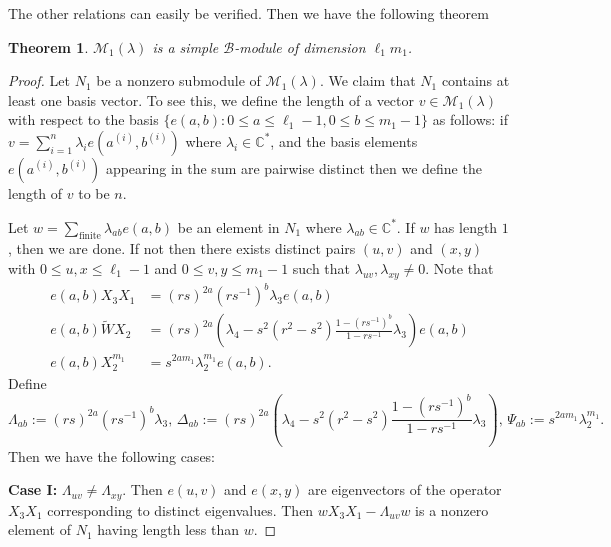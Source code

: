 \documentclass[12 pt,reqno]{amsart}
\numberwithin{equation}{section}
\newtheorem{thm}{Theorem}[section]
\theoremstyle{definition}
\theoremstyle{definition}
\theoremstyle{remark}
\theoremstyle{remark}
\begin{document}
The other relations can easily be verified. Then we have the following theorem
\begin{thm}\label{dim1}
    $\mathcal{M}_1(\lambda)$ is a simple $\mathcal{B}$-module of dimension $\ell_1 m_1$.
\end{thm}
\begin{proof}
    Let $N_1$ be a nonzero submodule of $\mathcal{M}_1(\lambda)$. We claim that $N_1$ contains at least one basis vector. To see this, we define the length of a vector $v \in \mathcal{M}_1(\lambda)$ with respect to the basis $\{e(a,b): 0 \leq a \leq \ell_1-1, 0 \leq b \leq m_1-1\}$ as follows: if $v=\sum_{i=1}^{n}\lambda_{i}e(a^{(i)},b^{(i)})$ where $\lambda_i \in \mathbb{C}^*$, and the basis elements $e(a^{(i)},b^{(i)})$ appearing in the sum are pairwise distinct then we define the length of $v$ to be $n$.
    
    \noindent Let $w=\sum_{\text{finite}}\lambda_{ab}e(a,b)$ be an element in $N_1$ where $\lambda_{ab} \in \mathbb{C}^*$. If $w$ has length $1$, then we are done. If not then there exists distinct pairs $(u,v)$ and $(x,y)$ with $0 \leq u,x \leq \ell_1-1$ and $0 \leq v,y \leq m_1-1$ such that $\lambda_{uv},\lambda_{xy} \neq 0$.
    Note that 
    \begin{align*}
        e(a,b)X_3X_1&=(rs)^{2a}(rs^{-1})^b \lambda_3 e(a,b)\\
        e(a,b)\tilde{W}X_2&=(rs)^{2a}\left(\lambda_4-s^2(r^2-s^2)\displaystyle\frac{1-(rs^{-1})^b}{1-rs^{-1}}\lambda_3\right)e(a,b)\\
        e(a,b)X_2^{m_1}&=s^{2am_1}\lambda_2^{m_1}e(a,b).
    \end{align*}
    Define \[\Lambda_{ab}:=(rs)^{2a}(rs^{-1})^b \lambda_3,\, \Delta_{ab}:=(rs)^{2a}\left(\lambda_4-s^2(r^2-s^2)\displaystyle\frac{1-(rs^{-1})^b}{1-rs^{-1}}\lambda_3\right), \,\Psi_{ab}:=s^{2am_1}\lambda_2^{m_1}.\]  
     Then we have the following cases:

\noindent\textbf{Case I:} $\Lambda_{uv} \neq \Lambda_{xy}$. Then $e(u,v)$ and $e(x,y)$ are eigenvectors of the operator $X_3X_1$ corresponding to distinct eigenvalues. Then $wX_3X_1-\Lambda_{uv}w$ is a nonzero element of $N_1$ having length less than $w$.
    

\end{proof}
\end{document}
